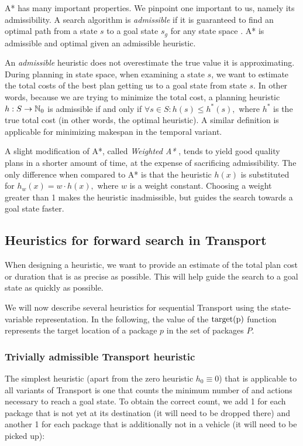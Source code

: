 A* has many important properties. We pinpoint one important to us, namely its admissibility.
A search algorithm is \textit{admissible}
if it is guaranteed to find an optimal path from a state $s$
to a goal state $s_g$ for any state space \citep{Hart1968}.
A* is admissible and optimal given an admissible heuristic.

An \textit{admissible} heuristic does not overestimate
the true value it is approximating. During planning in state space,
when examining a state $s$, we want to estimate the total costs of the best
plan getting us to a goal state from state $s$. In other words, because we are
trying to minimize the total cost,
a planning heuristic $h: S \to \mathbb{N}_0$ is admissible if and only if $\forall s \in S : h(s) \leq h^*(s),$
where $h^*$ is the true total cost (in other words, the optimal heuristic). A similar definition is applicable for minimizing makespan in the temporal variant.

A slight modification of A*, called \textit{Weighted A*} \citep{Pohl1970},
tends to yield good quality plans in a shorter amount of time,
at the expense of
sacrificing admissibility. The only difference
when compared to A* is that the heuristic $h(x)$
is substituted for $h_w(x) = w \cdot h(x),$
where $w$ is a weight constant. Choosing a weight greater
than 1 makes the heuristic inadmissible,
but guides the search towards a goal state faster.


\subsection{Heuristics for forward search in Transport}\label{seq-heuristics}

When designing a heuristic, we want to provide an estimate
of the total plan cost or duration
that is as precise as possible. This
will help guide the search to a goal state as quickly as
possible.

We will now describe several heuristics for sequential
Transport using the state-variable representation.
In the following, the value of the $\textrm{target(p)}$ function represents
the target location of a package $p$ in the set of packages $P$.

\subsubsection{Trivially admissible Transport heuristic}\label{sfa0}

The simplest heuristic (apart from the zero heuristic $h_0 \equiv 0$) that is applicable to all variants of Transport
is one that counts the minimum number of \pickup{} and \drop{} actions
necessary to reach a goal state.
To obtain the correct count, we add 1 for each
package that is not yet at its destination (it will need to be dropped there) and another 1 for each package
that is additionally not in a vehicle (it will need to be picked up):

